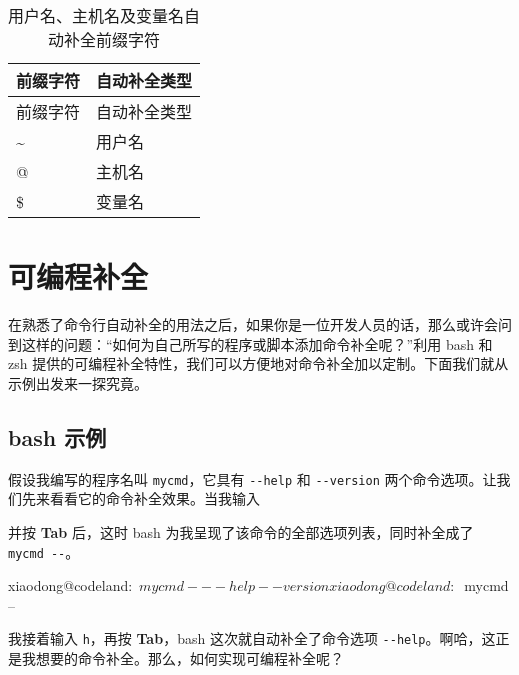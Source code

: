 \documentclass[]{ctexbook}
\newenvironment{Shaded}{\begin{snugshade}}{\end{snugshade}}
\newcommand{\ExtensionTok}[1]{#1}
\newcommand{\NormalTok}[1]{#1}
\begin{document}
\begin{longtable}[]{@{}ll@{}}
\caption{\label{tab:auto-comp-table} 用户名、主机名及变量名自动补全前缀字符}\tabularnewline
\toprule
前缀字符 & 自动补全类型\tabularnewline
\midrule
\endfirsthead
\toprule
前缀字符 & 自动补全类型\tabularnewline
\midrule
\endhead
\textasciitilde{} & 用户名\tabularnewline
@ & 主机名\tabularnewline
\$ & 变量名\tabularnewline
\bottomrule
\end{longtable}

\hypertarget{ux53efux7f16ux7a0bux8865ux5168}{%
\section{可编程补全}\label{ux53efux7f16ux7a0bux8865ux5168}}

在熟悉了命令行自动补全的用法之后，如果你是一位开发人员的话，那么或许会问到这样的问题：``如何为自己所写的程序或脚本添加命令补全呢？''利用 bash 和 zsh 提供的可编程补全特性，我们可以方便地对命令补全加以定制。下面我们就从示例出发来一探究竟。

\hypertarget{bash-ux793aux4f8b}{%
\subsection{bash 示例}\label{bash-ux793aux4f8b}}

假设我编写的程序名叫 \texttt{mycmd}，它具有 \texttt{-\/-help} 和 \texttt{-\/-version} 两个命令选项。让我们先来看看它的命令补全效果。当我输入

\begin{Shaded}
\end{Shaded}

并按 \textbf{Tab} 后，这时 bash 为我呈现了该命令的全部选项列表，同时补全成了 \texttt{mycmd\ -\/-}。

\begin{Shaded}
\begin{Highlighting}[]
\ExtensionTok{xiaodong@codeland}\NormalTok{:~$ mycmd -}
\ExtensionTok{--help}\NormalTok{     --version}
\ExtensionTok{xiaodong@codeland}\NormalTok{:~$ mycmd --}
\end{Highlighting}
\end{Shaded}

我接着输入 \texttt{h}，再按 \textbf{Tab}，bash 这次就自动补全了命令选项 \texttt{-\/-help}。啊哈，这正是我想要的命令补全。那么，如何实现可编程补全呢？
\end{document}
